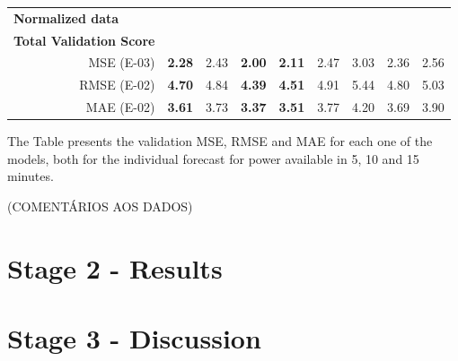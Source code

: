 \begin{table}[htbp]
\begin{tabular}{r|cccccccc}
    \midrule
    \multicolumn{1}{l|}{\textbf{Normalized data}} &       &       &       &       &       &       &       &  \\
    \textbf{Total Validation Score         } &       &       &       &       &       &       &       &  \\
    MSE (E-03)   & \textbf{2.28} & 2.43  & \textbf{2.00} & \textbf{2.11} & 2.47  & 3.03  & 2.36  & 2.56 \\
    RMSE (E-02)   & \textbf{4.70} & 4.84  & \textbf{4.39} & \textbf{4.51} & 4.91  & 5.44  & 4.80  & 5.03 \\
    MAE (E-02)   & \textbf{3.61} & 3.73  & \textbf{3.37} & \textbf{3.51} & 3.77  & 4.20  & 3.69  & 3.90 \\
    \end{tabular}%
  \label{valres}%
\end{table}%



The Table presents the validation \ac{MSE}, \ac{RMSE} and \ac{MAE} for each one of the models, both for the individual forecast for power available in 5, 10 and 15 minutes.



(COMENTÁRIOS AOS DADOS)

\section{Stage 2 - Results}\label{chap3:section:stage_2}

\section{Stage 3 - Discussion}\label{chap3:section:stage_3}